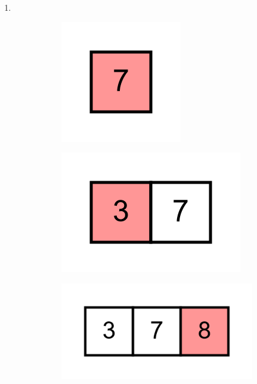 \documentclass[11pt,a4paper]{article}
\begin{document}
\begin{loesung}
\begin{enumerate}
        \newpage
        \item \ \\
        \begin{figure}[h!]
            \centering
            \begin{subfigure}[b]{0.31\textwidth}
                \centering
                \includegraphics[scale=0.15]{img/3d/1}
            \end{subfigure}
            \begin{subfigure}[b]{0.31\textwidth}
                \centering
                \includegraphics[scale=0.15]{img/3d/2}
            \end{subfigure}
            \begin{subfigure}[b]{0.31\textwidth}
                \centering
                \includegraphics[scale=0.15]{img/3d/3}
            \end{subfigure}
            \begin{subfigure}[b]{0.31\textwidth}

\end{subfigure}
\end{figure}
\end{enumerate}
\end{loesung}
\end{document}

